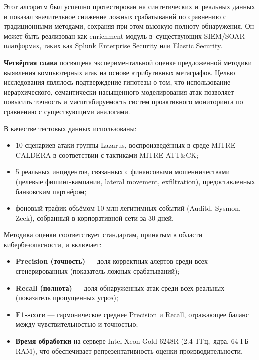 Этот алгоритм был успешно протестирован на синтетических и~реальных данных и показал значительное снижение ложных срабатываний по сравнению с традиционными методами, сохраняя при этом высокую полноту обнаружения. Он может быть реализован как enrichment-модуль в~существующих SIEM/SOAR-платформах, таких как Splunk Enterprise Security или Elastic Security.

\medskip

\underline{\textbf{Четвёртая глава}} посвящена экспериментальной оценке предложенной методики выявления компьютерных атак на основе атрибутивных метаграфов. Целью исследования являлось подтверждение гипотезы о том, что использование иерархического, семантически насыщенного моделирования атак позволяет повысить точность и масштабируемость систем проактивного мониторинга по сравнению с существующими аналогами.

В качестве тестовых данных использованы:
\begin{itemize}
    \item 10 сценариев атаки группы Lazarus, воспроизведённых в среде MITRE CALDERA в соответствии с тактиками MITRE ATT\&CK;
    \item 5 реальных инцидентов, связанных с финансовыми мошенничествами (целевые фишинг-кампании, lateral movement, exfiltration), \linebreak предоставленных банковским партнёром;
    \item фоновый трафик объёмом 10 млн легитимных событий (Auditd, Sysmon, Zeek), собранный в корпоративной сети за 30 дней.
\end{itemize}

Методика оценки соответствует стандартам, принятым в области кибербезопасности, и включает:
\begin{itemize}
    \item \textbf{Precision (точность)} — доля корректных алертов среди всех сгенерированных (показатель ложных срабатываний);
    \item \textbf{Recall (полнота)} — доля обнаруженных атак среди всех реальных (показатель пропущенных угроз);
    \item \textbf{F1-score} — гармоническое среднее Precision и Recall, отражающее баланс между чувствительностью и точностью;
    \item \textbf{Время обработки} на сервере Intel Xeon Gold 6248R (2.4~ГГц,~ядра, 64 ГБ RAM), что обеспечивает репрезентативность оценки производительности.
\end{itemize}


